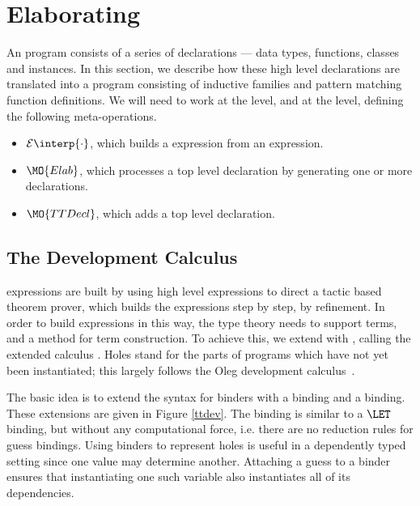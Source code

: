\newcommand{\ttinterp}[1]{\mathcal{E}\interp{#1}}
\newcommand{\ttpinterp}[1]{\mathcal{P}\interp{#1}}
\newcommand{\uninterp}[1]{\mathcal{T}\interp{#1}}

\section{Elaborating \Idris{}}

\label{sect:elaboration}

An \Idris{} program consists of a series of declarations --- data types,
functions, classes and instances. In this section, we describe how these
high level declarations are translated into a \TT{} program consisting of
inductive families and pattern matching function definitions. We will need to
work at the  level, and at the  level,
defining the following meta-operations.

\begin{itemize}
\item $\ttinterp{\cdot}$, which builds a \TT{} expression from an \Idris{} expression.
\item $\MO{Elab}$, which processes a top level \Idris{} declaration by generating
one or more \TT{} declarations.
\item $\MO{TTDecl}$, which adds a top level \TT{} declaration.
\end{itemize}


\subsection{The Development Calculus \TTdev}

\TT{} expressions are built by using high level \Idris{} expressions to
direct a tactic based theorem prover, which builds the \TT{} expressions
step by step, by refinement. In order to build expressions in this way,
the type theory needs to support
 terms, and a method for term construction. 
To achieve this, we extend \TT{} with ,
calling the extended calculus \TTdev{}.
Holes stand for the parts of programs which have not yet been
instantiated; this largely follows the Oleg development
calculus~\cite{McBride1999}.

The basic idea is to extend the syntax for binders with a 
binding and a  binding. 
These extensions are given in Figure \ref{ttdev}.
The  binding is
similar to a $\LET$ binding, but without any computational force,
i.e. there are no reduction rules for guess bindings. 
Using binders to represent holes is useful in a dependently typed setting since
one value may determine another. Attaching a guess to a binder ensures that
instantiating one such variable also instantiates all of its dependencies. 

